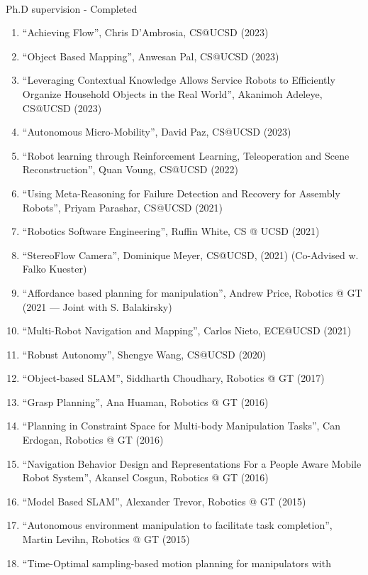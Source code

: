 \documentclass{article}
\begin{document}
\begin{cv}
\begin{cvlist}{~}
		\item[Ph.D supervision - Completed]\ \\
		\begin{enumerate}
			\item ``Achieving Flow'', Chris D'Ambrosia, CS@UCSD (2023)
			\item ``Object Based Mapping'', Anwesan Pal, CS@UCSD (2023)
			\item ``Leveraging Contextual Knowledge Allows Service Robots to Efficiently
			      Organize Household Objects in the Real World'', Akanimoh Adeleye,
			      CS@UCSD (2023)
			\item ``Autonomous Micro-Mobility'', David Paz, CS@UCSD (2023)
			\item ``Robot learning through Reinforcement Learning, Teleoperation
			      and Scene Reconstruction'', Quan Voung, CS@UCSD (2022)
			\item ``Using Meta-Reasoning for Failure Detection and Recovery for
			      Assembly Robots'', Priyam Parashar, CS@UCSD (2021)
			\item ``Robotics Software Engineering'', Ruffin White, CS @ UCSD (2021)
			\item ``StereoFlow Camera'', Dominique Meyer, CS@UCSD, (2021)
			      (Co-Advised w. Falko Kuester)
			\item ``Affordance based planning for manipulation'', Andrew Price, Robotics
			      @ GT (2021 --- Joint with S. Balakirsky)
			\item ``Multi-Robot Navigation and Mapping'', Carlos Nieto, ECE@UCSD (2021)
			\item ``Robust Autonomy'', Shengye Wang, CS@UCSD (2020)
			\item ``Object-based SLAM'', Siddharth Choudhary, Robotics @ GT (2017)
			\item ``Grasp Planning'', Ana Huaman, Robotics @ GT (2016)
			\item ``Planning in Constraint Space for Multi-body Manipulation Tasks'',
			      Can Erdogan, Robotics @ GT (2016)
			\item ``Navigation Behavior Design and Representations For a People Aware
			      Mobile Robot System'', Akansel Cosgun, Robotics @ GT (2016)
			\item ``Model Based SLAM'', Alexander Trevor, Robotics @ GT (2015)
			\item ``Autonomous environment manipulation to facilitate task completion'',
			      Martin Levihn, Robotics @ GT (2015)
			\item ``Time-Optimal sampling-based motion planning for manipulators with

\end{enumerate}
\end{cvlist}
\end{cv}
\end{document}
